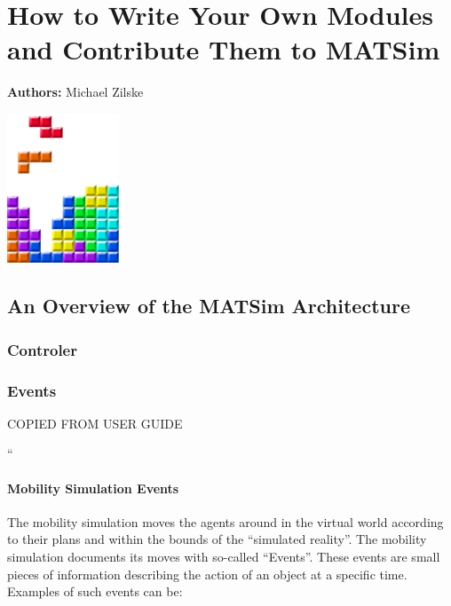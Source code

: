 \chapter{How to Write Your Own Modules and Contribute Them to MATSim }
\label{ch:extensionpoints}
\hfill \textbf{Authors:} Michael Zilske

\begin{center} \includegraphics[width=0.25\textwidth, angle=0]{figures/MATSimBook.png} \end{center}

\section{An Overview of the MATSim Architecture}
\subsection{Controler}

\subsection{Events}
\label{sec:events}

COPIED FROM USER GUIDE

``
\subsubsection{Mobility Simulation Events}

The mobility simulation moves the agents around in the virtual world according to their plans and within the bounds of the ``simulated reality''. The mobility simulation documents its moves with so-called ``Events''. These events are small pieces of information describing the action of an object at a specific time. Examples of such events can be:

